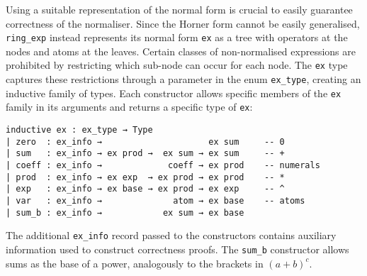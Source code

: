 \documentclass{llncs}
\newcommand{\lean}[1]{\texttt{#1}\xspace} %
\newcommand{\ex}{\lean{ex}}
\newcommand{\ring}{\lean{ring}}
\newcommand{\ringexp}{\lean{ring\_exp}}
\begin{document}
Using a suitable representation of the normal form is crucial to easily guarantee correctness of the normaliser.
Since the Horner form cannot be easily generalised,
\ringexp instead represents its normal form \ex as a tree with operators at the nodes and atoms at the leaves.
Certain classes of non-normalised expressions are prohibited by restricting which sub-node can occur for each node.
The \ex type captures these restrictions through a parameter in the enum \lean{ex\_type},
creating an inductive family of types.
Each constructor allows specific members of the \ex family in its arguments
and returns a specific type of \ex:
\begin{lstlisting}
inductive ex : ex_type → Type
| zero  : ex_info →                     ex sum     -- 0
| sum   : ex_info → ex prod →  ex sum → ex sum     -- +
| coeff : ex_info →             coeff → ex prod    -- numerals
| prod  : ex_info → ex exp  → ex prod → ex prod    -- *
| exp   : ex_info → ex base → ex prod → ex exp     -- ^
| var   : ex_info →              atom → ex base    -- atoms
| sum_b : ex_info →            ex sum → ex base
\end{lstlisting}
The additional \lean{ex\_info} record passed to the constructors contains auxiliary information used to construct correctness proofs.
The \lean{sum\_b} constructor allows sums as the base of a power, analogously to the brackets in $(a + b) ^ c$.
\end{document}
